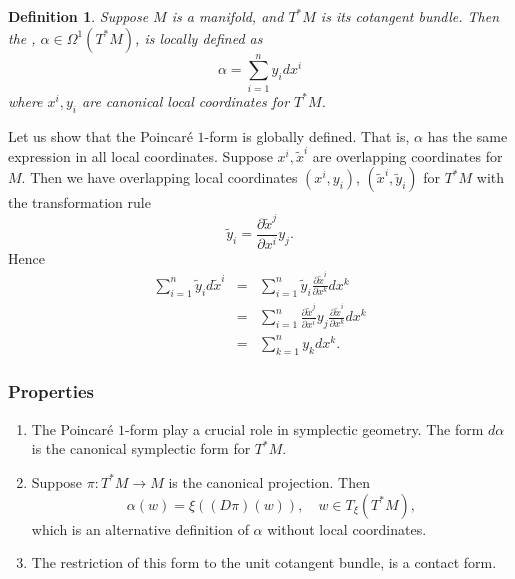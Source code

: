 \documentclass[12pt]{article}
\newtheorem{defn}{Definition}
\begin{document}
\begin{defn} Suppose $M$ is a manifold, and $T^\ast M$ is its cotangent bundle.
Then the , 
$\alpha \in \Omega^1(T^\ast M)$, is locally
defined as
$$ 
  \alpha = \sum_{i=1}^n y_i dx^i   
$$
where $x^i, y_i$ are canonical local coordinates for $T^\ast M$.
\end{defn}

Let us show that the Poincar\'e $1$-form is globally defined. That is, 
$\alpha$ has the same expression in all local coordinates. Suppose $x^i, \tilde{x}^i$ are overlapping coordinates for $M$. Then we have 
overlapping local coordinates $(x^i, y_i)$, $(\tilde{x}^i, \tilde{y}_i)$
for $T^\ast M$ with the transformation rule
$$
   \tilde{y}_i = \frac{\partial \tilde{x}^j}{\partial x^i} y_j.
$$
Hence
\begin{eqnarray*}
\sum_{i=1}^n \tilde{y}_i d\tilde{x}^i &=& \sum_{i=1}^n \tilde{y}_i \frac{\partial \tilde{x}^i}{\partial x^k} dx^k \\
&=& \sum_{i=1}^n \frac{\partial \tilde{x}^j}{\partial x^i} y_j \frac{\partial \tilde{x}^i}{\partial x^k} dx^k  \\
&=& \sum_{k=1}^n y_k dx^k.
\end{eqnarray*}

\subsubsection*{Properties}
\begin{enumerate}
\item The Poincar\'e $1$-form play a crucial role in symplectic geometry. 
The form $d\alpha$ is the canonical symplectic form for $T^\ast M$. 
\item Suppose $\pi\colon T^\ast M\to M$ is the canonical projection. 
Then
$$
  \alpha(w) = \xi( (D\pi)(w) ),\quad w\in T_\xi(T^\ast M),
$$
which is an alternative definition of $\alpha$ without local coordinates.
\item The restriction of this form to the unit cotangent bundle, is a 
contact form.
\end{enumerate}
\end{document}
